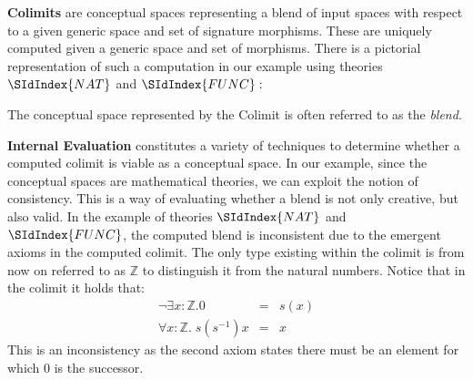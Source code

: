 {\bf Colimits} are conceptual spaces representing a blend of input
spaces with respect to a given generic space and set of signature
morphisms. These are uniquely computed given a generic space and set of
morphisms. There is a pictorial representation of such a computation
in our example using theories $\SIdIndex{NAT}$ and $\SIdIndex{FUNC}:$
\begin{center}
\end{center}
The conceptual space represented by the Colimit is often referred to
as the {\em blend}. 

{\bf Internal Evaluation} constitutes a variety of techniques to determine whether a computed colimit is viable as a conceptual space. In our example, since the conceptual spaces are mathematical theories, we can exploit the notion of consistency. This is a way of evaluating whether a
blend is not only creative, but also valid. In the example of theories
$\SIdIndex{NAT}$ and $\SIdIndex{FUNC}$,
the computed blend is inconsistent due to the emergent axioms in the
computed colimit. The only type existing within the colimit is from now
on referred to as $\mathbb{Z}$ to distinguish it from the natural
numbers. Notice that in the colimit it holds that:
\begin{eqnarray*}
\neg \exists x: \mathbb{Z}. 0 &=&s(x)\\
\forall x:\mathbb{Z}.\;s(s^{-1}) x &=& x
\end{eqnarray*}
This is an inconsistency as the second axiom states there must be an
element for which 0 is the successor.


